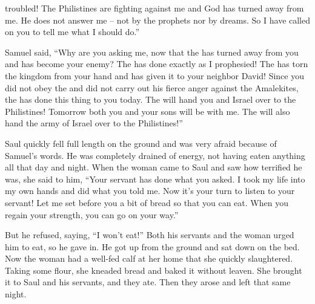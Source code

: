 {troubled! The Philistines
are fighting
against me and God
has turned
away from me. He does not
answer me – not by the prophets nor by dreams. So I have called on you to tell me what I should do.”
\par }{\PP {}Samuel
said,
“Why
are you asking
me, now that the
{}
has turned
away from you and has become
your enemy?
The
{}
has
done
exactly
as I prophesied! The
{}
has torn
the kingdom
from your hand
and has given
it to your neighbor
David!
Since
you did not
obey
the {}
and did not
carry
out his fierce
anger
against the Amalekites,
the {}
has done
this
thing
to you today.
The
{}
will hand
you
and Israel
over
to the Philistines! Tomorrow
both you
and your sons
will be with
me. The
{}
will also
hand
the
army
of Israel
over
to the Philistines!”
\par }{\PP {}Saul
quickly
fell
full
length
on the ground
and was very
afraid
because of Samuel’s
words.
He was
completely drained
of energy,
not
having
eaten
anything
all
that day
and night.
When the woman
came
to
Saul
and saw
how terrified
he was, she said
to
him, “Your servant
has done
what you asked.
I took
my life
into my own hands
and did what
you told
me.
Now
it’s your turn to listen
to your
servant! Let me
set
before
you
a bit
of bread
so that you can eat.
When
you regain your strength,
you can go
on your way.”
\par }{\PP {}But he refused,
saying,
“I won’t
eat!” Both
his servants
and the woman
urged
him to eat, so he gave in.
He got up
from the ground
and sat
down on
the bed.
Now the woman
had a well-fed
calf
at her home
that she quickly
slaughtered.
Taking
some flour,
she kneaded
bread
and baked
it without leaven.
She brought
it to Saul
and his servants,
and they ate.
Then they arose
and left
that same night.

}
